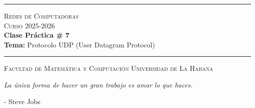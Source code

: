 \documentclass[12pt]{amsart}
\begin{document}
	\hrule
	\smallskip
	\begin{center}
		{\scshape {\large Redes de Computadoras} \\
			Curso 2025-2026} \\ \smallskip
		\textbf{Clase Práctica \# 7} \\
		{\small \textbf{Tema:} Protocolo UDP (User Datagram Protocol)}
	\end{center}
	\vspace{-8px}
	\rule{\linewidth}{2pt}
	
	{\scshape Facultad de Matemática y Computación}  \hfill {\scshape Universidad de La Habana}
	
	\bigskip\bigskip
	
	
	
	\vspace{1cm}
	
	\begin{center}
		\textit{La única forma de hacer un gran trabajo es amar lo que haces.}
	\end{center}
	
	\begin{flushright}
		- Steve Jobs
	\end{flushright}
	
	\vspace{1cm}
	
\end{document}
